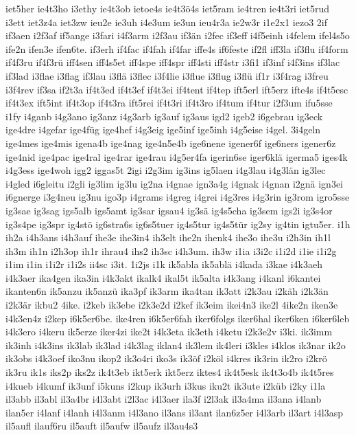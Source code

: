 {iet5her
ie4t3ho
i3ethy
ie4t3ob
ietoe4s
ie4t3ö4s
iet5ram
ie4tren
ie4t3ri
iet5rud
i3ett
iet3z4a
iet3zw
ieu2e
ie3uh
i4e3um
ie3un
ieu4r3a
ie2w3r
i1e2x1
iezo3
2if
if3aen
i2f3af
if5ange
i3fari
i4f3arm
i2f3au
if3än
i2fec
if3eff
i4f5einh
i4felem
ifel4s5o
ife2n
ifen3e
ifen6te.
if3erh
if4fac
if4fah
if4far
iffe4s
if6feste
if2fl
iff3la
if3flu
if4form
if4f3ru
if4f3rü
iff4sen
iff4s5et
iff4spe
iff4spr
iff4sti
iff4str
i3fi1
if3inf
i4f3ins
if3lac
if3lad
i3flae
i3flag
if3lau
i3flä
i3flec
i3f4lie
i3flue
i3flug
i3flü
if1r
i3f4rag
i3freu
i3f4rev
if3sa
if2t3a
if4t3ed
if4t3ef
if4t3ei
if4tent
if4tep
ift5erl
ift5erz
ifte4s
if4t5esc
if4t3ex
ift5int
if4t3op
if4t3ra
ift5rei
if4t3ri
if4t3ro
if4tum
if4tur
i2f3um
ifu5sse
i1fy
i4ganb
i4g3ano
ig3anz
i4g3arb
ig3auf
ig3aus
igd2
igeb2
i6gebrau
ig3eck
ige4dre
i4gefar
ige4füg
ige4hef
i4g3eig
ige5inf
ige5inh
i4g5eise
i4gel.
3i4geln
ige4mes
ige4mis
igena4b
ige4nag
ige4n5e4b
ige6nene
igener6f
ige6ners
igener6z
ige4nid
ige4pac
ige4ral
ige4rar
ige4rau
i4g5er4fa
igerin6se
iger6klä
igerma5
iges4k
i4g3ess
ige4woh
igg2
iggas5t
2igi
i2g3im
ig3ins
ig5laen
i4g3lau
i4g3län
ig3lec
i4gled
i6gleitu
i2gli
ig3lim
ig3lu
ig2na
i4gnae
ign3a4g
i4gnak
i4gnan
i2gnä
ign3ei
i6gnerge
i3g4neu
ig3nu
igo3p
i4grams
i4greg
i4grei
i4g3res
i4g3rin
ig3rom
igro5sse
ig3sae
ig3sag
igs5alb
igs5amt
ig3sar
igsau4
ig3sä
ig4s5cha
ig3sem
igs2i
ig3s4or
ig3s4pe
ig3spr
ig4stö
ig6stra6s
ig6s5tuer
ig4s5tur
ig4s5tür
ig2sy
ig4tin
igtu5er.
i1h
ih2a
i4h3ans
i4h3auf
ihe3e
ihe3in4
ih3elt
ihe2n
ihenk4
ihe3o
ihe3u
i2h3in
ih1l
ih3m
ih1n
i2h3op
ih1r
ihrau4
ihs2
ih3sc
i4h3um.
ih3w
i1ia
i3i2c
i1i2d
i1ie
i1i2g
i1im
i1in
i1i2r
i1i2s
ii4sc
i3it.
1i2js
i1k
ik5abla
ik5ablä
i4kada
i3kae
i4k3aeh
i4k3aer
ika4gen
ika3in
i4k3akt
ikalk4
ikal5t
ik5alta
i4k3ang
i4kanl
i6kantei
ikanten6n
ik5anzu
ik5anzü
ika3pf
ik3arm
ika4tan
ik3att
i2k3au
i2käh
i2k3än
i2k3är
ikbu2
4ike.
i2keb
ik3ebe
i2k3e2d
i2kef
ik3eim
ikei4n3
ike2l
4ike2n
iken3e
i4k3en4z
i2kep
i6k5er6be.
ike4ren
i6k5er6fah
iker6folgs
iker6hal
iker6ken
i6ker6leb
i4k3ero
i4keru
ik5erze
iker4zi
ike2t
i4k3eta
ik3eth
i4ketu
i2k3e2v
i3ki.
ik3imm
ik3inh
i4k3ins
ik3lab
ik3lad
i4k3lag
iklan4
ik3lem
ik4leri
i3kles
i4klos
ik3nar
ik2o
ik3obs
i4k3oef
iko3nu
ikop2
ik3o4ri
iko3s
ik3öf
i2köl
i4kres
ik3rin
ik2ro
i2krö
ik3ru
ik1s
iks2p
iks2z
ik4t3eb
ikt5erk
ikt5erz
iktes4
ik4t5esk
ik4t3o4b
ik4t5res
i4kueb
i4kumf
ik3unf
i5kuns
i2kup
ik3urh
i3kus
iku2t
ik3ute
i2küb
i2ky
i1la
il3abb
il3abl
il3a4br
i4l3abt
i2l3ac
i4l3aer
ila3f
i2l3ak
il3a4ma
il3ana
i4lanb
ilan5er
i4lanf
i4lanh
i4l3anm
i4l3ano
il3ans
il3ant
ilan6z5er
i4l3arb
il3art
i4l3asp
il5aufl
ilauf6ru
il5auft
il5aufw
il5aufz
il3au4s3
}
